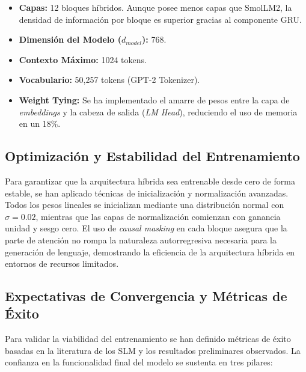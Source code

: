 \begin{itemize}
    \item \textbf{Capas:} 12 bloques híbridos. Aunque posee menos capas que SmolLM2, la densidad de información por bloque es superior gracias al componente GRU.
    \item \textbf{Dimensión del Modelo ($d_{model}$):} 768.
    \item \textbf{Contexto Máximo:} 1024 tokens.
    \item \textbf{Vocabulario:} 50,257 tokens (GPT-2 Tokenizer).
    \item \textbf{Weight Tying:} Se ha implementado el amarre de pesos entre la capa de \textit{embeddings} y la cabeza de salida (\textit{LM Head}), reduciendo el uso de memoria en un 18\%.
\end{itemize}

\subsection{Optimización y Estabilidad del Entrenamiento}
Para garantizar que la arquitectura híbrida sea entrenable desde cero de forma estable, se han aplicado técnicas de inicialización y normalización avanzadas. Todos los pesos lineales se inicializan mediante una distribución normal con $\sigma = 0.02$, mientras que las capas de normalización comienzan con ganancia unidad y sesgo cero. El uso de \textit{causal masking} en cada bloque asegura que la parte de atención no rompa la naturaleza autorregresiva necesaria para la generación de lenguaje, demostrando la eficiencia de la arquitectura híbrida en entornos de recursos limitados.

\subsection{Expectativas de Convergencia y Métricas de Éxito}
Para validar la viabilidad del entrenamiento se han definido métricas de éxito basadas en la literatura de los SLM y los resultados preliminares observados. La confianza en la funcionalidad final del modelo se sustenta en tres pilares:

